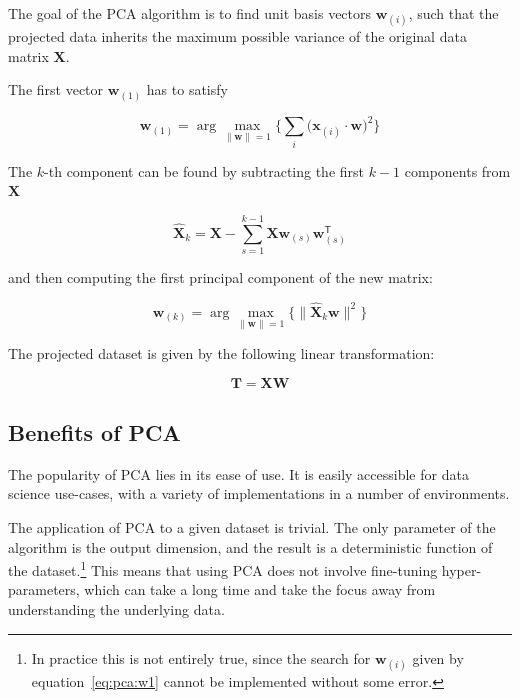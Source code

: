 The goal of the PCA algorithm is to find unit basis vectors $\mathbf{w}_{(i)}$, such that the projected data inherits the maximum possible variance of the original data matrix $\mathbf{X}$.

The first vector $\mathbf{w}_{(1)}$ has to satisfy

\begin{equation}
	\mathbf{w}_{(1)} = \arg\max_{\lVert \mathbf{w} \rVert = 1}{ \Bigg\{ \sum_i{ \big(\mathbf{x}_{(i)} \cdot \mathbf{w} \big)^2 } \Bigg\} }
	\label{eq:pca:w1}
\end{equation}

The $k$-th component can be found by subtracting the first $k - 1$ components from $\mathbf{X}$

\begin{equation}
	\mathbf{\hat{X}}_{k}=\mathbf{X}-\sum_{s=1}^{k-1}\mathbf{X}\mathbf{w}_{(s)}\mathbf{w}_{(s)}^{\mathsf{T}}
	\label{eq:pca_xhat}
\end{equation}

and then computing the first principal component of the new matrix:

\begin{equation}
	\mathbf{w}_{(k)}=\arg\max_{\lVert \mathbf{w} \rVert = 1}{\Bigg\{ \lVert \mathbf{\hat {X}}_{k}\mathbf{w} \rVert ^2 \Bigg\} }
	\label{eq:pca:wk}
\end{equation}

The projected dataset is given by the following linear transformation:

\begin{equation}
	\mathbf{T} = \mathbf{XW}
	\label{eq:pca:t}
\end{equation}

\subsection{Benefits of PCA}\label{subsec:benefits-of-pca}

The popularity of PCA lies in its ease of use. It is easily accessible for data science use-cases, with a variety of implementations in a number of environments.

The application of PCA to a given dataset is trivial. The only parameter of the algorithm is the output dimension, and the result is a deterministic function of the dataset.\footnote{In practice this is not entirely true, since the search for $\mathbf{w}_{(i)}$ given by equation~\eqref{eq:pca:w1} cannot be implemented without some error.} This means that using PCA does not involve fine-tuning hyper-parameters, which can take a long time and take the focus away from understanding the underlying data.

